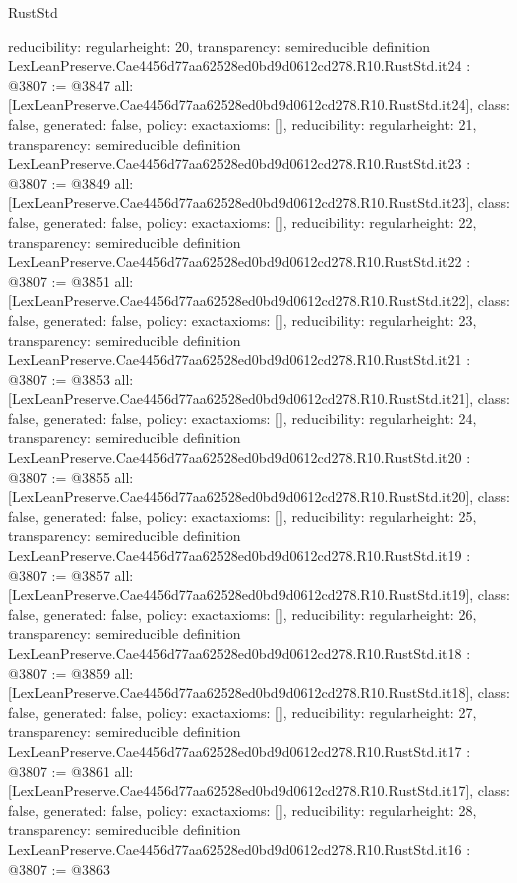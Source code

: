 \begin{lexlean}{RustStd}
\begin{coremodule}
{  reducibility: regular{height: 20},
  transparency: semireducible
}
definition LexLeanPreserve.Cae4456d77aa62528ed0bd9d0612cd278.R10.RustStd.it24 : @3807 := @3847 {
  all: [LexLeanPreserve.Cae4456d77aa62528ed0bd9d0612cd278.R10.RustStd.it24],
  class: false,
  generated: false,
  policy: exact{axioms: []},
  reducibility: regular{height: 21},
  transparency: semireducible
}
definition LexLeanPreserve.Cae4456d77aa62528ed0bd9d0612cd278.R10.RustStd.it23 : @3807 := @3849 {
  all: [LexLeanPreserve.Cae4456d77aa62528ed0bd9d0612cd278.R10.RustStd.it23],
  class: false,
  generated: false,
  policy: exact{axioms: []},
  reducibility: regular{height: 22},
  transparency: semireducible
}
definition LexLeanPreserve.Cae4456d77aa62528ed0bd9d0612cd278.R10.RustStd.it22 : @3807 := @3851 {
  all: [LexLeanPreserve.Cae4456d77aa62528ed0bd9d0612cd278.R10.RustStd.it22],
  class: false,
  generated: false,
  policy: exact{axioms: []},
  reducibility: regular{height: 23},
  transparency: semireducible
}
definition LexLeanPreserve.Cae4456d77aa62528ed0bd9d0612cd278.R10.RustStd.it21 : @3807 := @3853 {
  all: [LexLeanPreserve.Cae4456d77aa62528ed0bd9d0612cd278.R10.RustStd.it21],
  class: false,
  generated: false,
  policy: exact{axioms: []},
  reducibility: regular{height: 24},
  transparency: semireducible
}
definition LexLeanPreserve.Cae4456d77aa62528ed0bd9d0612cd278.R10.RustStd.it20 : @3807 := @3855 {
  all: [LexLeanPreserve.Cae4456d77aa62528ed0bd9d0612cd278.R10.RustStd.it20],
  class: false,
  generated: false,
  policy: exact{axioms: []},
  reducibility: regular{height: 25},
  transparency: semireducible
}
definition LexLeanPreserve.Cae4456d77aa62528ed0bd9d0612cd278.R10.RustStd.it19 : @3807 := @3857 {
  all: [LexLeanPreserve.Cae4456d77aa62528ed0bd9d0612cd278.R10.RustStd.it19],
  class: false,
  generated: false,
  policy: exact{axioms: []},
  reducibility: regular{height: 26},
  transparency: semireducible
}
definition LexLeanPreserve.Cae4456d77aa62528ed0bd9d0612cd278.R10.RustStd.it18 : @3807 := @3859 {
  all: [LexLeanPreserve.Cae4456d77aa62528ed0bd9d0612cd278.R10.RustStd.it18],
  class: false,
  generated: false,
  policy: exact{axioms: []},
  reducibility: regular{height: 27},
  transparency: semireducible
}
definition LexLeanPreserve.Cae4456d77aa62528ed0bd9d0612cd278.R10.RustStd.it17 : @3807 := @3861 {
  all: [LexLeanPreserve.Cae4456d77aa62528ed0bd9d0612cd278.R10.RustStd.it17],
  class: false,
  generated: false,
  policy: exact{axioms: []},
  reducibility: regular{height: 28},
  transparency: semireducible
}
definition LexLeanPreserve.Cae4456d77aa62528ed0bd9d0612cd278.R10.RustStd.it16 : @3807 := @3863 {
}
\end{coremodule}
\end{lexlean}
